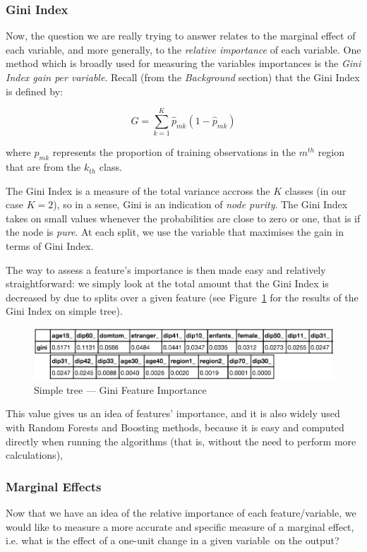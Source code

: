 \subsubsection{Gini Index}
Now, the question we are really trying to answer relates to the marginal effect of each variable, and more generally, to the \textit{relative importance} of each variable. One method which is broadly used for measuring the variables importances is the \textit{Gini Index gain per variable}. Recall (from the \textit{Background} section) that the Gini Index is defined by:

\begin{equation}
    G = \sum_{k=1}^{K} \hat{p}_{mk}(1-\hat{p}_{mk})
\end{equation}

where $\hat{p}_{mk}$ represents the proportion of training observations in the $m^{th}$ region that are from the $k_{th}$ class.

The Gini Index is a measure of the total variance accross the $K$ classes (in our case $K=2$), so in a sense, Gini is an indication of \textit{node purity}. The Gini Index takes on small values whenever the probabilities are close to zero or one, that is if the node is \textit{pure}. At each split, we use the variable that maximises the gain in terms of Gini Index.

The way to assess a feature's importance is then made easy and relatively straightforward: we simply look at the total amount that the Gini Index is decreased by due to splits over a given feature (see Figure~\ref{fig:simple_tree_gini} for the results of the Gini Index on simple tree).

\begin{figure}
    \centering
    \includegraphics[scale=0.33]{img/simple_tree_gini.png}
    \caption{Simple tree --- Gini Feature Importance}
    \label{fig:simple_tree_gini}
\end{figure}

This value gives us an idea of features' importance, and it is also widely used with Random Forests and Boosting methods, because it is easy and computed directly when running the algorithms (that is, without the need to perform more calculations),

\subsubsection{Marginal Effects}
Now that we have an idea of the relative importance of each feature/variable, we would like to measure a more accurate and specific measure of a marginal effect, i.e. what is the effect of a one-unit change in a given variable on the output?

